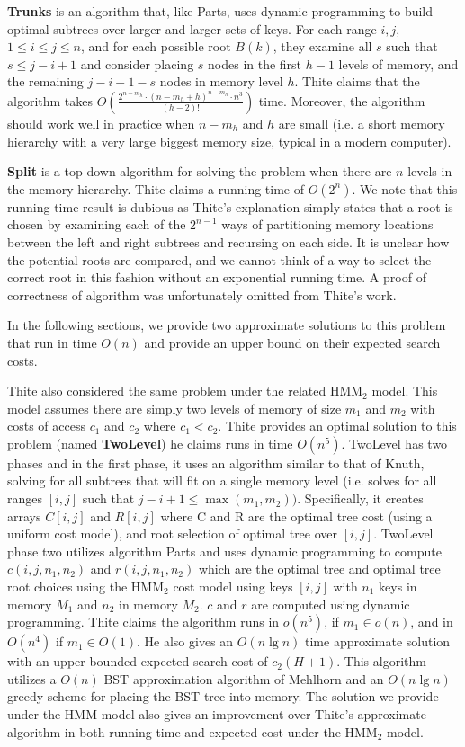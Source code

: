 \documentclass[letterpaper,12pt,titlepage,oneside,final]{book}
\theoremstyle{plain}
\begin{document}
\textbf{Trunks} is an algorithm that, like Parts, uses dynamic programming to build optimal subtrees over larger and larger sets of keys. For each range $i,j$, $1 \leq i \leq j \leq n$, and for each possible root $B(k)$, they examine all $s$ such that $s \leq j-i+1$ and consider placing $s$ nodes in the first $h-1$ levels of memory, and the remaining $j-i-1-s$ nodes in memory level $h$. Thite claims that the algorithm takes $O(\frac{2^{n-m_h}\cdot (n-m_h+h)^{n-m_h}\cdot n^3}{(h-2)!})$ time. Moreover, the algorithm should work well in practice when $n-m_h$ and $h$ are small (i.e. a short memory hierarchy with a very large biggest memory size, typical in a modern computer).

\textbf{Split} is a top-down algorithm for solving the problem when there are $n$ levels in the memory hierarchy. Thite claims a running time of $O(2^n)$. We note that this running time result is dubious as Thite's explanation simply states that a root is chosen by examining each of the $2^{n-1}$ ways of partitioning memory locations between the left and right subtrees and recursing on each side. It is unclear how the potential roots are compared, and we cannot think of a way to select the correct root in this fashion without an exponential running time. A proof of correctness of algorithm was unfortunately omitted from Thite's work.

 In the following sections, we provide two approximate solutions to this problem that run in time $O(n)$ and provide an upper bound on their expected search costs. 
 
Thite also considered the same problem under the related HMM$_2$ model. This model assumes there are simply two levels of memory of size $m_1$ and $m_2$ with costs of access $c_1$ and $c_2$ where $c_1 < c_2$. Thite provides an optimal solution to this problem (named \textbf{TwoLevel}) he claims runs in time $O(n^5)$.
TwoLevel has two phases and in the first phase, it uses an algorithm similar to that of Knuth, solving for all subtrees that will fit on a single memory level (i.e. solves for all ranges $[i,j]$ such that $j-i+1 \leq \max(m_1, m_2))$. Specifically, it creates arrays $C[i,j]$ and $R[i,j]$ where C and R are the optimal tree cost (using a uniform cost model), and root selection of optimal tree over $[i,j]$.
TwoLevel phase two utilizes algorithm Parts and uses dynamic programming to compute $c(i,j,n_1,n_2)$ and $r(i,j,n_1, n_2)$ which are the optimal tree and optimal tree root choices using the HMM$_2$ cost model using keys $[i,j]$ with $n_1$ keys in memory $M_1$ and $n_2$ in memory $M_2$. $c$ and $r$ are computed using dynamic programming. Thite claims the algorithm runs in $o(n^5)$, if $m_1 \in o(n)$, and in $O(n^4)$ if $m_1 \in O(1)$. He also gives an $O(n\lg n)$ time approximate solution with an upper bounded expected search cost of $c_2(H+1)$. This algorithm utilizes a $O(n)$ BST approximation algorithm of Mehlhorn \cite{mehlhorn1984sorting} and an $O(n \lg n)$ greedy scheme for placing the BST tree into memory. The solution we provide under the HMM model also gives an improvement over Thite's approximate algorithm in both running time and expected cost under the HMM$_2$ model.
\end{document}
